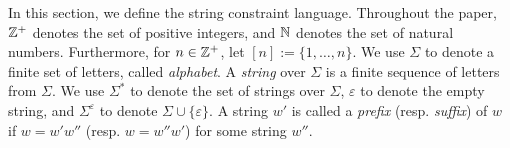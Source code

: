 {	%
	
	
	
}
In this section, we define the string constraint language. Throughout the paper, $\mathbb{Z}^+$ denotes the set of positive integers, and  $\mathbb{N}$ denotes the set of natural numbers. Furthermore, for $n\in \mathbb{Z}^+$, let $[n]:=\{1, \ldots, n\}$. 
%
We use $\Sigma$ to denote a finite set of letters, called \emph{alphabet}. A \emph{string} over $\Sigma$ is a finite sequence of letters from $\Sigma$. We use $\Sigma^*$ to denote the set of strings over $\Sigma$, $\varepsilon$ to denote the empty string, and $\Sigma^\varepsilon$ to denote $\Sigma \cup \{\varepsilon\}$. 
A string $w'$ is called a \emph{prefix} (resp. \emph{suffix}) of $w$ if $w = w'w''$ (resp. $w = w'' w'$) for some string $w''$. 



